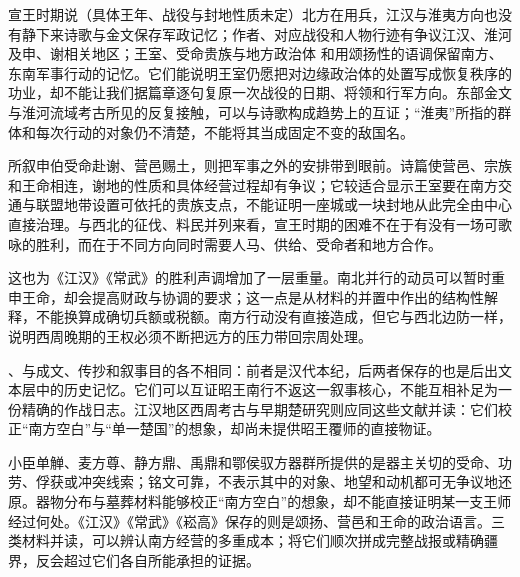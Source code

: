 \begin{event}{宣王时期说（具体王年、战役与封地性质未定）}{北方在用兵，江汉与淮夷方向也没有静下来}{诗歌与金文保存军政记忆；作者、对应战役和人物行迹有争议}{江汉、淮河及申、谢相关地区；王室、受命贵族与地方政治体}
和用颂扬性的语调保留南方、东南军事行动的记忆。它们能说明王室仍愿把对边缘政治体的处置写成恢复秩序的功业，却不能让我们据篇章逐句复原一次战役的日期、将领和行军方向。东部金文与淮河流域考古所见的反复接触，可以与诗歌构成趋势上的互证；“淮夷”所指的群体和每次行动的对象仍不清楚，不能将其当成固定不变的敌国名。

所叙申伯受命赴谢、营邑赐土，则把军事之外的安排带到眼前。诗篇使营邑、宗族和王命相连，谢地的性质和具体经营过程却有争议；它较适合显示王室要在南方交通与联盟地带设置可依托的贵族支点，不能证明一座城或一块封地从此完全由中心直接治理。与西北的征伐、料民并列来看，宣王时期的困难不在于有没有一场可歌咏的胜利，而在于不同方向同时需要人马、供给、受命者和地方合作。

这也为《江汉》《常武》的胜利声调增加了一层重量。南北并行的动员可以暂时重申王命，却会提高财政与协调的要求；这一点是从材料的并置中作出的结构性解释，不能换算成确切兵额或税额。南方行动没有直接造成，但它与西北边防一样，说明西周晚期的王权必须不断把远方的压力带回宗周处理。
\end{event}

\begin{sourcenote}[一条河与三层材料]
、与成文、传抄和叙事目的各不相同：前者是汉代本纪，后两者保存的也是后出文本层中的历史记忆。它们可以互证昭王南行不返这一叙事核心，不能互相补足为一份精确的作战日志。江汉地区西周考古与早期楚研究则应同这些文献并读：它们校正“南方空白”与“单一楚国”的想象，却尚未提供昭王覆师的直接物证。
\end{sourcenote}

\begin{sourcenote}[铭文、器物分布与颂诗不能互相替代]
小臣单觯、麦方尊、静方鼎、禹鼎和鄂侯驭方器群所提供的是器主关切的受命、功劳、俘获或冲突线索；铭文可靠，不表示其中的对象、地望和动机都可无争议地还原。器物分布与墓葬材料能够校正“南方空白”的想象，却不能直接证明某一支王师经过何处。《江汉》《常武》《崧高》保存的则是颂扬、营邑和王命的政治语言。三类材料并读，可以辨认南方经营的多重成本；将它们顺次拼成完整战报或精确疆界，反会超过它们各自所能承担的证据。
\end{sourcenote}
